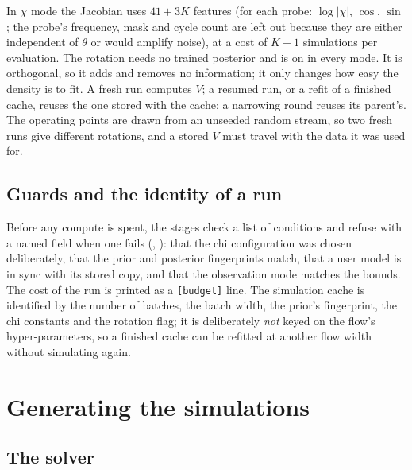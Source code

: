 \documentclass[10pt,a4paper]{article}
\newcommand{\file}[1]{{\small\path{#1}}}
\newcommand{\code}[1]{\texttt{\detokenize{#1}}}
\begin{document}
In $\chi$ mode the Jacobian uses $41+3K$ features (for each probe: $\log|\chi|$, $\cos$, $\sin$; the probe's
frequency, mask and cycle count are left out because they are either independent of $\theta$ or would amplify
noise), at a cost of $K+1$ simulations per evaluation. The rotation needs no trained posterior and is on in every
mode. It is orthogonal, so it adds and removes no information; it only changes how easy the density is to fit. A
fresh run computes $V$; a resumed run, or a refit of a finished cache, reuses the one stored with the cache; a
narrowing round reuses its parent's. The operating points are drawn from an unseeded random stream, so two fresh
runs give different rotations, and a stored $V$ must travel with the data it was used for.

\subsection{Guards and the identity of a run}

Before any compute is spent, the stages check a list of conditions and refuse with a named field when one fails
(\file{core/refusals.py}, \code{run_guards}): that the chi configuration was chosen deliberately, that the prior
and posterior fingerprints match, that a user model is in sync with its stored copy, and that the observation mode
matches the bounds. The cost of the run is printed as a \texttt{[budget]} line. The simulation cache is identified
by the number of batches, the batch width, the prior's fingerprint, the chi constants and the rotation flag; it is
deliberately \emph{not} keyed on the flow's hyper-parameters, so a finished cache can be refitted at another flow
width without simulating again.

\section{Generating the simulations}
\label{sec:sim}

\subsection{The solver}
\end{document}
